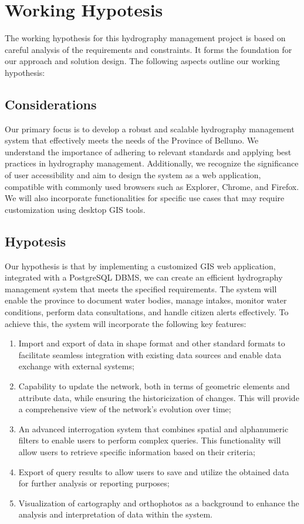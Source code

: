 \section{Working Hypotesis}
\label{sec:working_hypotesis}

The working hypothesis for this hydrography management project is based on careful analysis of the requirements and constraints. It forms the foundation for our approach and solution design. The following aspects outline our working hypothesis:

\subsection{Considerations}
Our primary focus is to develop a robust and scalable hydrography management system that effectively meets the needs of the Province of Belluno. We understand the importance of adhering to relevant standards and applying best practices in hydrography management. Additionally, we recognize the significance of user accessibility and aim to design the system as a web application, compatible with commonly used browsers such as Explorer, Chrome, and Firefox. We will also incorporate functionalities for specific use cases that may require customization using desktop GIS tools.

\subsection{Hypotesis}
Our hypothesis is that by implementing a customized GIS web application, integrated with a PostgreSQL DBMS, we can create an efficient hydrography management system that meets the specified requirements. The system will enable the province to document water bodies, manage intakes, monitor water conditions, perform data consultations, and handle citizen alerts effectively. To achieve this, the system will incorporate the following key features:
\begin{enumerate}
    \item Import and export of data in shape format and other standard formats to facilitate seamless integration with existing data sources and enable data exchange with external systems;
    \item Capability to update the network, both in terms of geometric elements and attribute data, while ensuring the historicization of changes. This will provide a comprehensive view of the network's evolution over time;
    \item An advanced interrogation system that combines spatial and alphanumeric filters to enable users to perform complex queries. This functionality will allow users to retrieve specific information based on their criteria;
    \item Export of query results to allow users to save and utilize the obtained data for further analysis or reporting purposes;
    \item Visualization of cartography and orthophotos as a background to enhance the analysis and interpretation of data within the system.
\end{enumerate}

